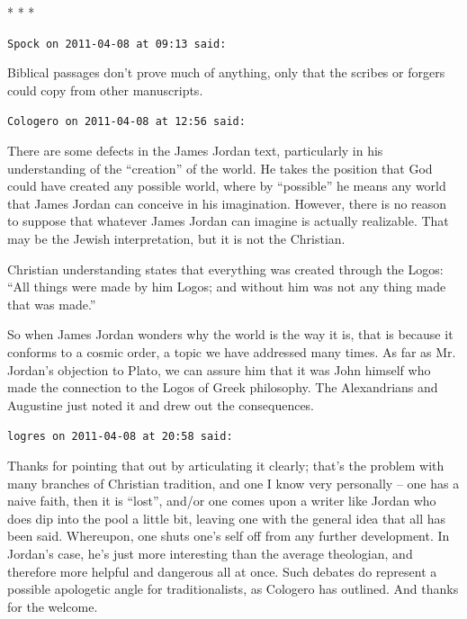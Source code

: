 
\begin{center}* * *\end{center}

\begin{footnotesize}
\begin{sffamily}
\texttt{Spock on 2011-04-08 at 09:13 said:}

Biblical passages don't prove much of anything, only that the scribes or forgers could copy from other manuscripts.

\hfill

\texttt{Cologero on 2011-04-08 at 12:56 said:}

There are some defects in the James Jordan text, particularly in his understanding of the ``creation'' of the world. He takes the position that God could have created any possible world, where by ``possible'' he means any world that James Jordan can conceive in his imagination. However, there is no reason to suppose that whatever James Jordan can imagine is actually realizable. That may be the Jewish interpretation, but it is not the Christian.

Christian understanding states that everything was created through the Logos: ``All things were made by him Logos; and without him was not any thing made that was made.''

So when James Jordan wonders why the world is the way it is, that is because it conforms to a cosmic order, a topic we have addressed many times. As far as Mr. Jordan's objection to Plato, we can assure him that it was John himself who made the connection to the Logos of Greek philosophy. The Alexandrians and Augustine just noted it and drew out the consequences.

\hfill

\texttt{logres on 2011-04-08 at 20:58 said:}

Thanks for pointing that out by articulating it clearly; that's the problem with many branches of Christian tradition, and one I know very personally -- one has a naive faith, then it is ``lost'', and/or one comes upon a writer like Jordan who does dip into the pool a little bit, leaving one with the general idea that all has been said. Whereupon, one shuts one's self off from any further development. In Jordan's case, he's just more interesting than the average theologian, and therefore more helpful and dangerous all at once. Such debates do represent a possible apologetic angle for traditionalists, as Cologero has outlined. And thanks for the welcome.


\end{sffamily}
\end{footnotesize}
